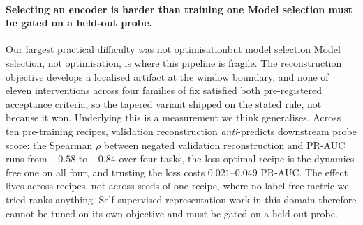 \documentclass{article}
\providecommand{\DIFaddtex}[1]{{\protect\color{blue} \sf #1}} %
\providecommand{\DIFdeltex}[1]{{\protect\color{red} \scriptsize #1}} %
\providecommand{\DIFaddbegin}{} %
\providecommand{\DIFaddend}{} %
\providecommand{\DIFdelbegin}{} %
\providecommand{\DIFdelend}{} %
\providecommand{\DIFadd}[1]{\texorpdfstring{\DIFaddtex{#1}}{#1}} %
\providecommand{\DIFdel}[1]{\texorpdfstring{\DIFdeltex{#1}}{}} %
\providecommand{\DIFscaledelfig}{0.5}
\newlength{\DIFdelgraphicswidth} %
\newlength{\DIFdelgraphicsheight} %
\providecommand{\DIFaddincludegraphics}[2][]{{\color{blue}\fbox{\DIFOincludegraphics[#1]{#2}}}} %
\providecommand{\DIFdelincludegraphics}[2][]{%
\sbox{\DIFdelgraphicsbox}{\DIFOincludegraphics[#1]{#2}}%
\settoboxwidth{\DIFdelgraphicswidth}{\DIFdelgraphicsbox} %
\settoboxtotalheight{\DIFdelgraphicsheight}{\DIFdelgraphicsbox} %
\scalebox{\DIFscaledelfig}{%
\parbox[b]{\DIFdelgraphicswidth}{\usebox{\DIFdelgraphicsbox}\\[-\baselineskip] \rule{\DIFdelgraphicswidth}{0em}}\llap{\resizebox{\DIFdelgraphicswidth}{\DIFdelgraphicsheight}{%
\setlength{\unitlength}{\DIFdelgraphicswidth}%
\begin{picture}(1,1)%
\thicklines\linethickness{2pt} %
{\color[rgb]{1,0,0}\put(0,0){\framebox(1,1){}}}%
{\color[rgb]{1,0,0}\put(0,0){\line( 1,1){1}}}%
{\color[rgb]{1,0,0}\put(0,1){\line(1,-1){1}}}%
\end{picture}%
}\hspace*{3pt}}} %
} %
\DeclareRobustCommand{\DIFaddbegin}{\DIFOaddbegin \let\includegraphics\DIFaddincludegraphics} %
\DeclareRobustCommand{\DIFaddend}{\DIFOaddend \let\includegraphics\DIFOincludegraphics} %
\DeclareRobustCommand{\DIFdelbegin}{\DIFOdelbegin \let\includegraphics\DIFdelincludegraphics} %
\DeclareRobustCommand{\DIFdelend}{\DIFOaddend \let\includegraphics\DIFOincludegraphics} %
\begin{document}
\paragraph{\DIFdelbegin \DIFdel{Selecting an encoder is harder than training one}\DIFdelend \DIFaddbegin \DIFadd{Model selection must be gated on a held-out probe}\DIFaddend .} \DIFdelbegin \DIFdel{Our largest practical difficulty was
not optimisationbut model selection}\DIFdelend \DIFaddbegin \DIFadd{Model selection, not optimisation, is
where this pipeline is fragile}\DIFaddend . The reconstruction objective develops a localised artifact at the
window boundary, and none of eleven interventions across four families of fix satisfied both
pre-registered acceptance criteria, so the tapered variant shipped on the stated rule, not because it
won. Underlying this is a
measurement we think generalises. Across ten pre-training
recipes, validation reconstruction \emph{anti}-predicts downstream probe score: the Spearman $\rho$
between negated validation reconstruction and PR-AUC runs from $-0.58$ to $-0.84$ over four tasks, the
loss-optimal recipe is the dynamics-free one on all four, and trusting the loss costs $0.021$--$0.049$
PR-AUC. The effect lives across recipes, not across seeds of one recipe, where no label-free metric we
tried ranks anything. Self-supervised representation work in this domain therefore cannot be tuned on
its own objective and must be gated on a held-out probe.
\end{document}
